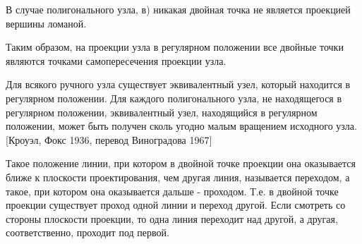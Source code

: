 В случае полигонального узла, в) никакая двойная точка не является проекцией вершины ломаной.

Таким образом, на проекции узла в регулярном положении все двойные точки являются точками самопересечения проекции узла.

Для всякого ручного узла существует эквивалентный узел, который находится в регулярном положении.
Для каждого полигонального узла, не находящегося в регулярном положении, эквивалентный узел, находящийся в регулярном положении, может быть получен сколь угодно малым вращением исходного узла. [Кроуэл, Фокс 1936, перевод Виноградова 1967]

Такое положение линии, при котором в двойной точке проекции она оказывается ближе к плоскости проектирования, чем другая линия, называется переходом, а такое, при котором она оказывается дальше - проходом. Т.е. в двойной точке проекции существует проход одной линии и переход другой. Если смотреть со стороны плоскости проекции, то одна линия переходит над другой, а другая, соответственно, проходит под первой.


